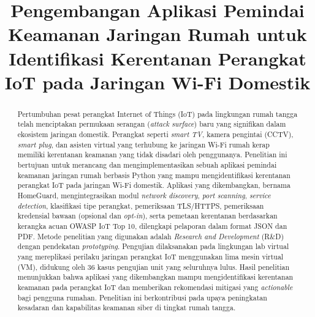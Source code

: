 \documentclass[conference]{IEEEtran}
\begin{document}
\title{Pengembangan Aplikasi Pemindai Keamanan Jaringan Rumah untuk Identifikasi Kerentanan Perangkat IoT pada Jaringan Wi-Fi Domestik}

\author{
}

\maketitle

\begin{abstract}
Pertumbuhan pesat perangkat Internet of Things (IoT) pada lingkungan rumah tangga telah menciptakan permukaan serangan (\textit{attack surface}) baru yang signifikan dalam ekosistem jaringan domestik. Perangkat seperti \textit{smart TV}, kamera pengintai (CCTV), \textit{smart plug}, dan asisten virtual yang terhubung ke jaringan Wi-Fi rumah kerap memiliki kerentanan keamanan yang tidak disadari oleh penggunanya. Penelitian ini bertujuan untuk merancang dan mengimplementasikan sebuah aplikasi pemindai keamanan jaringan rumah berbasis Python yang mampu mengidentifikasi kerentanan perangkat IoT pada jaringan Wi-Fi domestik. Aplikasi yang dikembangkan, bernama HomeGuard, mengintegrasikan modul \textit{network discovery}, \textit{port scanning}, \textit{service detection}, klasifikasi tipe perangkat, pemeriksaan TLS/HTTPS, pemeriksaan kredensial bawaan (opsional dan \textit{opt-in}), serta pemetaan kerentanan berdasarkan kerangka acuan OWASP IoT Top 10, dilengkapi pelaporan dalam format JSON dan PDF. Metode penelitian yang digunakan adalah \textit{Research and Development} (R\&D) dengan pendekatan \textit{prototyping}. Pengujian dilaksanakan pada lingkungan lab virtual yang mereplikasi perilaku jaringan perangkat IoT menggunakan lima mesin virtual (VM), didukung oleh 36 kasus pengujian unit yang seluruhnya lulus. Hasil penelitian menunjukkan bahwa aplikasi yang dikembangkan mampu mengidentifikasi kerentanan keamanan pada perangkat IoT dan memberikan rekomendasi mitigasi yang \textit{actionable} bagi pengguna rumahan. Penelitian ini berkontribusi pada upaya peningkatan kesadaran dan kapabilitas keamanan siber di tingkat rumah tangga.
\end{abstract}
\end{document}
